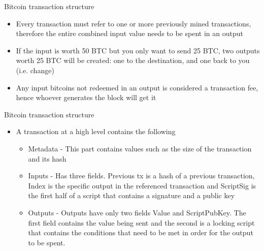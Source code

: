 \documentclass[9pt]{beamer}
\begin{document}

\begin{frame}{Bitcoin transaction structure}
	\begin{itemize}
		\item Every transaction must refer to one or more previously mined transactions, therefore the entire combined input value needs to be spent in an output
		\item If the input is worth 50 BTC but you only want to send 25 BTC, two outputs worth 25 BTC will be created: one to the destination, and one back to you (i.e. change)
		\item Any input bitcoins not redeemed in an output is considered a transaction fee, hence whoever generates the block will get it
	\end{itemize}
\end{frame}


\begin{frame}{Bitcoin transaction structure}
	\begin{itemize}
		\item A transaction at a high level contains the following
		\begin{itemize}
			\item Metadata - This part contains values such as the size of the transaction and its hash
			\item Inputs -  Has three fields. Previous tx is a hash of a previous transaction, Index is the specific output in the referenced transaction and ScriptSig is the first half of a script that contains a signature and a public key
			\item Outputs - Outputs have only two fields Value and ScriptPubKey. The first field contains the value being sent and the second is a locking script that contains the conditions that need to be met in order for the output to be spent.
		\end{itemize}
	\end{itemize}
\end{frame}

\end{document}

